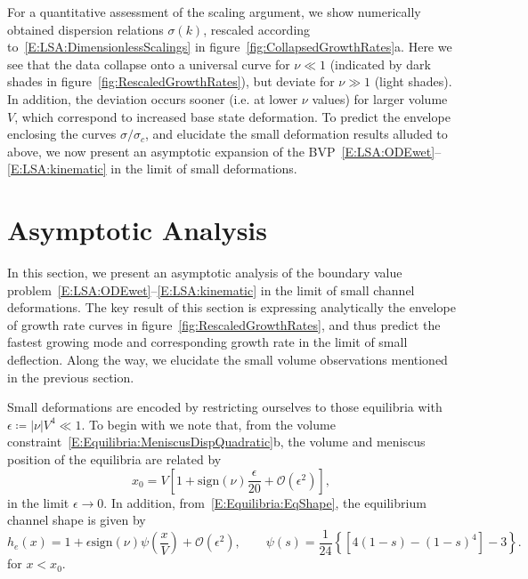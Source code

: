 \documentclass{jfm}
\newcommand{\order}[1]{\mathcal{O}\left(#1\right)}
\begin{document}
For a quantitative assessment of the scaling argument, we show numerically obtained dispersion relations $\sigma(k)$, rescaled according to~\eqref{E:LSA:DimensionlessScalings} in figure~\ref{fig:CollapsedGrowthRates}a. Here we see that the data collapse onto a universal curve for $\nu \ll 1$ (indicated by dark shades in figure~\ref{fig:RescaledGrowthRates}), but deviate for $\nu \gg 1$ (light shades). In addition, the deviation occurs sooner (i.e. at lower $\nu$ values) for larger volume $V$, which correspond to increased base state deformation. To predict the envelope enclosing the curves $\sigma/\sigma_c$, and elucidate the small deformation results alluded to above, we now present an asymptotic expansion of the BVP~\eqref{E:LSA:ODEwet}--\eqref{E:LSA:kinematic} in the limit of small deformations.


\section{Asymptotic Analysis}\label{S:Asymptotics}
\newcommand{\param}{\delta} %
In this section, we present an asymptotic analysis of the boundary value problem~\eqref{E:LSA:ODEwet}--\eqref{E:LSA:kinematic}  in the limit of small channel deformations. The key result of this section is expressing analytically the envelope of growth rate curves in figure~\ref{fig:RescaledGrowthRates}, and thus predict the fastest growing mode and corresponding growth rate in the limit of small deflection. Along the way, we elucidate the small volume observations mentioned in the previous section.

Small deformations are encoded by restricting ourselves to those equilibria with $\epsilon  \coloneqq |\nu| V^4 \ll 1$. To begin with we note that, from the volume constraint~\eqref{E:Equilibria:MeniscusDispQuadratic}b, the volume and meniscus position of the  equilibria are related by
\begin{equation}\label{E:Asymptotics:EqMeniscusPositionExpansion}
    x_0 = V\left[1 + \mathrm{sign}(\nu) \frac{\epsilon}{20} + \order{\epsilon^2}\right],
\end{equation}
in the limit $\epsilon \to 0$. In addition, from~\eqref{E:Equilibria:EqShape}, the equilibrium channel shape is given by
\begin{equation}\label{E:Asymptotics:EqChannelShapeExpansion}
    h_e(x) = 1 + \epsilon \mathrm{sign}(\nu)\psi\left(\frac{x}{V}\right) + \order{\epsilon^2}, \qquad \psi(s) = \frac{1}{24}\left\{\left[4(1-s) - (1-s)^4\right]-3\right\}.
\end{equation}
for $x < x_0$.
\end{document}
